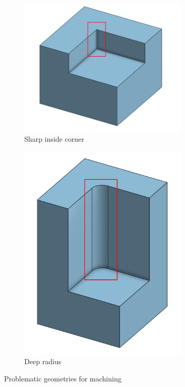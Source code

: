 \documentclass[10pt,letterpaper]{book}
\begin{document}
\begin{figure}[H]
	\centering
	\begin{subfigure}[b]{.24\linewidth}
		\includegraphics[width=0.9\textwidth]{imgs/nonmill_sharpins.png}
		\caption{Sharp inside corner}
	\end{subfigure}	\begin{subfigure}[b]{.24\linewidth}
		\includegraphics[width=0.9\textwidth]{imgs/nonmill_dtod.png}
		\caption{Deep radius}
	\end{subfigure}	
	
	\caption{Problematic geometries for machining}
\end{figure}
\end{document}
